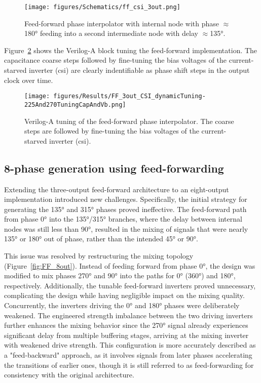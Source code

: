 \begin{figure}[h]
  \centering
  \texttt{[image: figures/Schematics/ff\_csi\_3out.png]}
  \caption{Feed-forward phase interpolator with internal node with phase $\approx$\ang{180} feeding into a second intermediate node with delay  $\approx$\ang{135}.}
  \label{fig:FF_half_1}
\end{figure}

Figure~\ref{fig:FF_half_Verilog-A_tuning} shows the Verilog-A block tuning the feed-forward implementation. The capacitance coarse steps followed by fine-tuning the bias voltages of the current-starved inverter (\gls{csi}) are clearly indentifiable as phase shift steps in the output clock over time.

\begin{figure}[h]
  \centering
  \texttt{[image: figures/Results/FF\_3out\_CSI\_dynamicTuning-225And270TuningCapAndVb.png]}
  \caption{Verilog-A tuning of the feed-forward phase interpolator. The coarse steps are followed by fine-tuning the bias voltages of the current-starved inverter (\gls{csi}).}
  \label{fig:FF_half_Verilog-A_tuning}
\end{figure}

\subsection{8-phase generation using feed-forwarding}\label{sec:8phase_FF}

Extending the three-output feed-forward architecture to an eight-output implementation introduced new challenges. Specifically, the initial strategy for generating the \ang{135} and \ang{315} phases proved ineffective. The feed-forward path from phase \ang{0} into the \ang{135}/\ang{315} branches, where the delay between internal nodes was still less than \ang{90}, resulted in the mixing of signals that were nearly \ang{135} or \ang{180} out of phase, rather than the intended \ang{45} or \ang{90}.

This issue was resolved by restructuring the mixing topology (Figure~\ref{fig:FF_8out}). Instead of feeding forward from phase \ang{0}, the design was modified to mix phases \ang{270} and \ang{90} into the paths for \ang{0} (\ang{360}) and \ang{180}, respectively. Additionally, the tunable feed-forward inverters proved unnecessary, complicating the design while having negligible impact on the mixing quality. Concurrently, the inverters driving the \ang{0} and \ang{180} phases were deliberately weakened. The engineered strength imbalance between the two driving inverters further enhances the mixing behavior since the \ang{270} signal already experiences significant delay from multiple buffering stages, arriving at the mixing inverter with weakened drive strength. This configuration is more accurately described as a "feed-backward" approach, as it involves signals from later phases accelerating the transitions of earlier ones, though it is still referred to as feed-forwarding for consistency with the original architecture.

